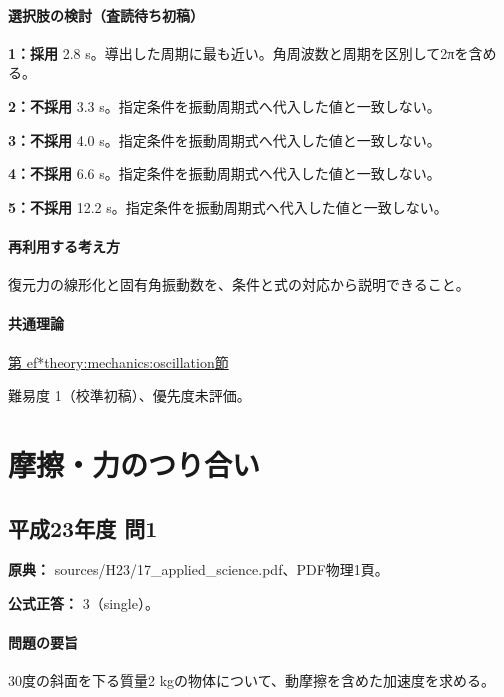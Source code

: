 \paragraph{選択肢の検討（査読待ち初稿）}

\noindent\textbf{1：採用} 2.8 s。導出した周期に最も近い。角周波数と周期を区別して2πを含める。\par

\noindent\textbf{2：不採用} 3.3 s。指定条件を振動周期式へ代入した値と一致しない。\par

\noindent\textbf{3：不採用} 4.0 s。指定条件を振動周期式へ代入した値と一致しない。\par

\noindent\textbf{4：不採用} 6.6 s。指定条件を振動周期式へ代入した値と一致しない。\par

\noindent\textbf{5：不採用} 12.2 s。指定条件を振動周期式へ代入した値と一致しない。\par

\paragraph{再利用する考え方} 復元力の線形化と固有角振動数を、条件と式の対応から説明できること。

\paragraph{共通理論} \hyperref[theory:mechanics:oscillation]{第
ef*{theory:mechanics:oscillation}節}

\par 難易度 1（校準初稿）、優先度未評価。

\section{摩擦・力のつり合い}

\subsection{平成23年度 問1}
\label{q:h23-reg-applied-01}

\noindent\textbf{原典：} sources/H23/17\_applied\_science.pdf、PDF物理1頁。

\textbf{公式正答：} 3（single）。

\paragraph{問題の要旨} 30度の斜面を下る質量2 kgの物体について、動摩擦を含めた加速度を求める。

